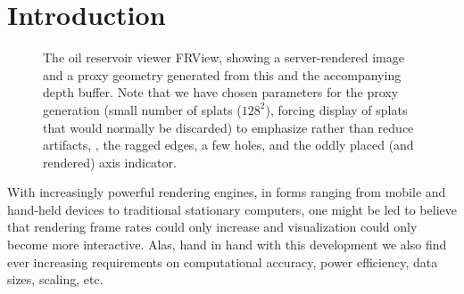 \section{Introduction}

\begin{figure}[htb]
  \centering
  \caption{\label{fig:FRView} The oil reservoir viewer FRView, showing a
  server-rendered image and a proxy geometry generated from this and the
  accompanying depth buffer. Note that we have chosen parameters for the proxy
  generation (small number of splats ($128^2$), forcing display of splats that
  would normally be discarded) to emphasize rather than reduce artifacts, \eg,
  the ragged edges, a few holes, and the oddly placed (and rendered) axis
  indicator.}
\end{figure}

With increasingly powerful rendering engines, in forms ranging from mobile and
hand-held devices to traditional stationary computers, one might be led to
believe that rendering frame rates could only increase and visualization could
only become more interactive. Alas, hand in hand with this development we also
find ever increasing requirements on computational accuracy, power efficiency,
data sizes, scaling, etc.

